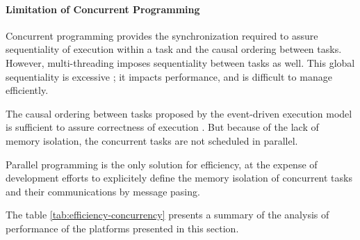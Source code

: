 \paragraph{Limitation of Concurrent Programming}




Concurrent programming provides the synchronization required to assure sequentiality of execution within a task and the causal ordering between tasks.
However, multi-threading imposes sequentiality between tasks as well.
This global sequentiality is excessive ; it impacts performance, and is difficult to manage efficiently.

The causal ordering between tasks proposed by the event-driven execution model is sufficient to assure correctness of execution \cite{Lamport1978,Reed2012}.
But because of the lack of memory isolation, the concurrent tasks are not scheduled in parallel.

Parallel programming is the only solution for efficiency, at the expense of development efforts to explicitely define the memory isolation of concurrent tasks and their communications by message pasing.


\separator

The table \ref{tab:efficiency-concurrency} presents a summary of the analysis of performance of the platforms presented in this section.








